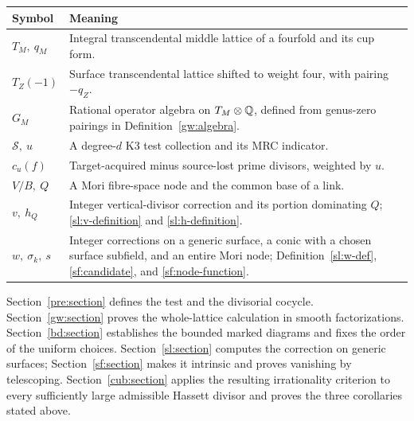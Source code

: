 \begin{center}
\small
\begin{tabular}{@{}p{}p{}@{}}
\toprule
Symbol & Meaning \\
\midrule
\(T_M,\ q_M\) & Integral transcendental middle lattice of a fourfold and its cup form. \\
\(T_Z(-1)\) & Surface transcendental lattice shifted to weight four, with pairing \(-q_Z\). \\
\(G_M\) & Rational operator algebra on \(T_M\otimes\mathbb Q\), defined from genus-zero pairings in Definition~\ref{gw:algebra}. \\
\(\mathcal S,\ u\) & A degree-\(d\) K3 test collection and its MRC indicator. \\
\(c_u(f)\) & Target-acquired minus source-lost prime divisors, weighted by \(u\). \\
\(V/B,\ Q\) & A Mori fibre-space node and the common base of a link. \\
\(v,\ h_Q\) & Integer vertical-divisor correction and its portion dominating \(Q\); \eqref{sl:v-definition} and \eqref{sl:h-definition}. \\
\(w,\ \sigma_k,\ s\) & Integer corrections on a generic surface, a conic with a chosen surface subfield, and an entire Mori node; Definition~\ref{sl:w-def}, \eqref{sf:candidate}, and \eqref{sf:node-function}. \\
\bottomrule
\end{tabular}
\end{center}

Section~\ref{pre:section} defines the test and the divisorial cocycle.
Section~\ref{gw:section} proves the whole-lattice calculation in smooth
factorizations. Section~\ref{bd:section} establishes the bounded marked
diagrams and fixes the order of the uniform choices.
Section~\ref{sl:section} computes the correction on generic surfaces;
Section~\ref{sf:section} makes it intrinsic and proves vanishing by
telescoping. Section~\ref{cub:section} applies the resulting irrationality
criterion to every sufficiently large admissible Hassett divisor and
proves the three corollaries stated above.
